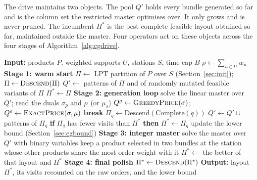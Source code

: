 \documentclass[]{interact}
\begin{document}
The drive maintains two objects. The pool $Q'$ holds every bundle generated so far and is the column set the restricted master optimises over. It only grows and is never pruned. The incumbent $\Pi^{\ast}$ is the best complete feasible layout obtained so far, maintained outside the master. Four operators act on these objects across the four stages of Algorithm~\ref{alg:cgdrive}.

\begin{algorithm}[H]
\caption{Price-and-complete drive for the set-partitioning master}
\label{alg:cgdrive}
\begin{algorithmic}[1]
\State \textbf{Input:} products $P$, weighted supports $U$, stations $S$, time cap $B$
\State $\rho\gets\sum_{u\in U}w_u$ 
\Statex
\State \textbf{Stage 1: warm start}
\State $\Pi\gets$ LPT partition of $P$ over $S$ (Section~\ref{sec:init}); $\Pi\gets\Call{Descend}{\Pi}$
\State $Q'\gets$ patterns of $\Pi$ and of randomly mutated feasible variants of $\Pi$
\State $\Pi^{\ast}\gets\Pi$
\Statex
\State \textbf{Stage 2: generation loop}
  \State solve the linear master over $Q'$; read the duals $\sigma_p$ and $\mu$ (or $\mu_s$) 
  \State $Q^{g}\gets\Call{GreedyPrice}{\sigma}$; $Q^{e}\gets\Call{ExactPrice}{\sigma,\mu}$
    \State \textbf{break} 
  \EndIf
    \State $\Pi_q \gets \mathrm{Descend}(\mathrm{Complete}(q))$
      \State $Q'\gets Q'\cup$ patterns of $\Pi_q$
      \State \textbf{if} $\Pi_q$ has fewer visits than $\Pi^{\ast}$ \textbf{then} $\Pi^{\ast}\gets\Pi_q$
    \EndIf
  \EndFor
  \State update the lower bound (Section~\ref{sec:cgbound})
\EndWhile
\Statex
\State \textbf{Stage 3: integer master}
\State solve the master over $Q'$ with binary variables
\State keep a product selected in two bundles at the station whose other products share the most order weight with it 
\State $\Pi^{\ast}\gets$ the better of that layout and $\Pi^{\ast}$
\Statex
\State \textbf{Stage 4: final polish}
\State $\Pi^{\ast}\gets\Call{Descend}{\Pi^{\ast}}$
\State \textbf{Output:} layout $\Pi^{\ast}$, its visits recounted on the raw orders, and the lower bound
\end{algorithmic}
\end{algorithm}
\end{document}

